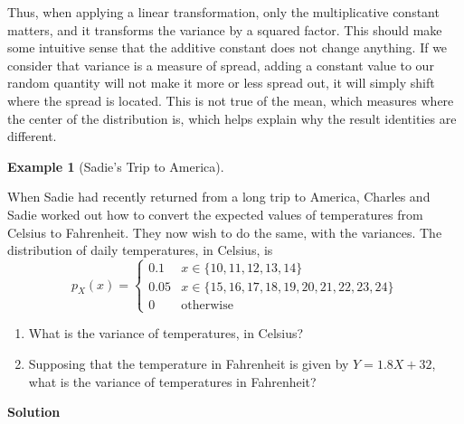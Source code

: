 \documentclass[
  letterpaper,
  DIV=11,
  numbers=noendperiod]{scrreprt}
\providecommand{\tightlist}{%
  \setlength{\itemsep}{0pt}\setlength{\parskip}{0pt}}\usepackage{longtable,booktabs,array}
\theoremstyle{definition}
\theoremstyle{definition}
\newtheorem{example}{Example}[chapter]
\theoremstyle{definition}
\theoremstyle{remark}
\begin{document}
Thus, when applying a linear transformation, only the multiplicative
constant matters, and it transforms the variance by a squared factor.
This should make some intuitive sense that the additive constant does
not change anything. If we consider that variance is a measure of
spread, adding a constant value to our random quantity will not make it
more or less spread out, it will simply shift where the spread is
located. This is not true of the mean, which measures where the center
of the distribution is, which helps explain why the result identities
are different.

\begin{example}[Sadie's Trip to
America]\protect\hypertarget{exm-var-linear-transformation}{}\label{exm-var-linear-transformation}

When Sadie had recently returned from a long trip to America, Charles
and Sadie worked out how to convert the expected values of temperatures
from Celsius to Fahrenheit. They now wish to do the same, with the
variances. The distribution of daily temperatures, in Celsius, is
\[p_X(x) = \begin{cases}
    0.1 & x \in \{10, 11, 12, 13, 14\} \\
    0.05 & x \in \{15, 16, 17, 18, 19, 20, 21, 22, 23, 24\} \\
    0 & \text{otherwise}
\end{cases}\]

\begin{enumerate}
\def\labelenumi{\alph{enumi}.}
\tightlist
\item
  What is the variance of temperatures, in Celsius?
\item
  Supposing that the temperature in Fahrenheit is given by
  \(Y = 1.8X + 32\), what is the variance of temperatures in Fahrenheit?
\end{enumerate}

\begin{tcolorbox}[enhanced jigsaw, colback=white, colframe=quarto-callout-color-frame, arc=.35mm, leftrule=.75mm, rightrule=.15mm, opacityback=0, breakable, bottomrule=.15mm, left=2mm, toprule=.15mm]

\vspace{-3mm}\textbf{Solution}\vspace{3mm}


\end{tcolorbox}
\end{example}
\end{document}
